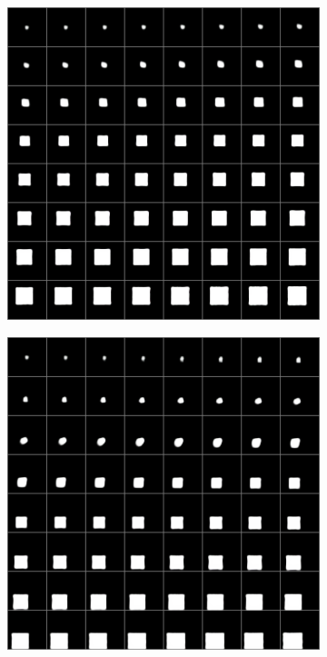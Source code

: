 \documentclass[10pt,a4paper]{article}
\begin{document}
\begin{figure}[!ht]
\begin{subfigure}{0.49\textwidth}
	\includegraphics[width=\textwidth]{square_interpolation_x.png}
	\caption{}
	\label{fig1:subim2}
\end{subfigure}
\begin{subfigure}{0.49\textwidth}
	\centering	
	\includegraphics[width=\textwidth ] {square_interpolation_y.png}

\end{subfigure}
\end{figure}
\end{document}
